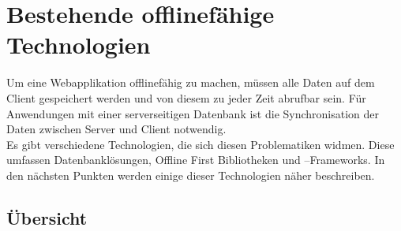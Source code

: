 %
%
\chapter{\label{chap:state}Bestehende offlinefähige Technologien}
Um eine Webapplikation offlinefähig zu machen, müssen alle Daten auf dem Client gespeichert werden und von diesem zu jeder Zeit abrufbar sein.
Für Anwendungen mit einer serverseitigen Datenbank ist die Synchronisation der Daten zwischen Server und Client notwendig.\\
Es gibt verschiedene Technologien, die sich diesen Problematiken widmen.
Diese umfassen Datenbanklösungen, Offline First Bibliotheken und --Frameworks. In den nächsten Punkten werden einige dieser Technologien näher beschreiben.
%
%

%
%

%
%

%
%

%
%

%
\clearpage
\section{Übersicht}
